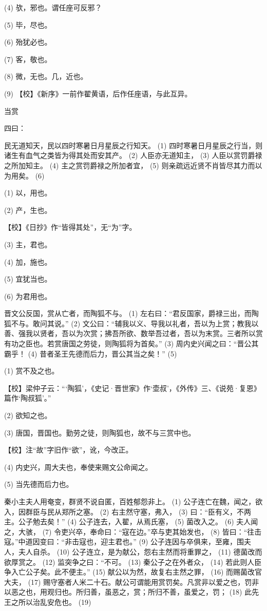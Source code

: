 \documentclass[12pt,UTF8]{ctexbook}
\begin{document}
(4) 欤，邪也。谓任座可反邪？

(5) 毕，尽也。

(6) 殆犹必也。

(7) 客，敬也。

(8) 微，无也。几，近也。

(9) 【校】《新序》一前作翟黄语，后作任座语，与此互异。





当赏


四曰：

民无道知天，民以四时寒暑日月星辰之行知天。 (1) 四时寒暑日月星辰之行当，则诸生有血气之类皆为得其处而安其产。 (2) 人臣亦无道知主， (3) 人臣以赏罚爵禄之所加知主。 (4) 主之赏罚爵禄之所加者宜， (5) 则亲疏远近贤不肖皆尽其力而以为用矣。 (6)

(1) 以，用也。

(2) 产，生也。

【校】《日抄》作“皆得其处”，无“为”字。

(3) 主，君也。

(4) 加，施也。

(5) 宜犹当也。

(6) 为君用也。

晋文公反国，赏从亡者，而陶狐不与。 (1) 左右曰：“君反国家，爵禄三出，而陶狐不与。敢问其说。” (2) 文公曰：“辅我以义、导我以礼者，吾以为上赏；教我以善、强我以贤者，吾以为次赏；拂吾所欲、数举吾过者，吾以为末赏。三者所以赏有功之臣也。若赏唐国之劳徒，则陶狐将为首矣。” (3) 周内史兴闻之曰：“晋公其霸乎！ (4) 昔者圣王先德而后力，晋公其当之矣！” (5)

(1) 赏不及之也。

【校】梁仲子云：“‘陶狐’，《史记·晋世家》作‘壶叔’，《外传》三、《说苑·复恩》篇作‘陶叔狐’。”

(2) 欲知之也。

(3) 唐国，晋国也。勤劳之徒，则陶狐也，故不与三赏中也。

【校】注“故”字旧作“欲”，讹，今改正。

(4) 内史兴，周大夫也，奉使来赐文公命闻之。

(5) 当先德而后力也。

秦小主夫人用奄变，群贤不说自匿，百姓郁怨非上。 (1) 公子连亡在魏，闻之，欲入，因群臣与民从郑所之塞。 (2) 右主然守塞，弗入， (3) 曰：“臣有义，不两主。公子勉去矣！” (4) 公子连去，入翟，从焉氏塞， (5) 菌改入之。 (6) 夫人闻之，大骇， (7) 令吏兴卒，奉命曰：“寇在边。”卒与吏其始发也， (8) 皆曰：“往击寇。”中道因变曰：“非击寇也，迎主君也。” (9) 公子连因与卒俱来，至雍，围夫人，夫人自杀。 (10) 公子连立，是为献公，怨右主然而将重罪之， (11) 德菌改而欲厚赏之。 (12) 监突争之曰：“不可。 (13) 秦公子之在外者众， (14) 若此则人臣争入亡公子矣。此不便主。” (15) 献公以为然，故复右主然之罪， (16) 而赐菌改官大夫， (17) 赐守塞者人米二十石。献公可谓能用赏罚矣。凡赏非以爱之也，罚非以恶之也，用观归也。所归善，虽恶之，赏；所归不善，虽爱之，罚； (18) 此先王之所以治乱安危也。 (19)
\end{document}
